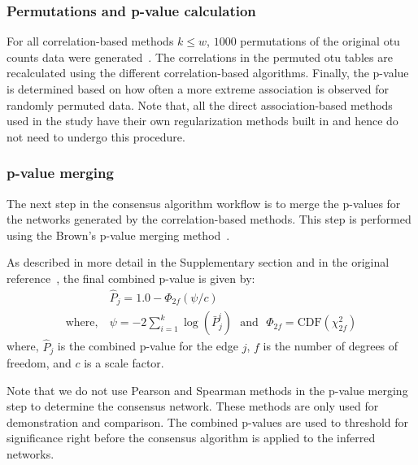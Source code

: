 \documentclass[letterpaper,12pt]{article}
\begin{document}
  \subsubsection*{Permutations and p-value calculation}
  \vspace{-5mm}
  For all correlation-based methods $k \le w$, $1000$ permutations of the original \ac{otu} counts data were generated~\cite{Watts2018}.
  The correlations in the permuted \ac{otu} tables are recalculated using the different correlation-based algorithms.
  Finally, the p-value is determined based on how often a more extreme association is observed for randomly permuted data.
  Note that, all the direct association-based methods used in the study have their own regularization methods built in and hence do not need to undergo this procedure.

  \subsubsection*{p-value merging}
  \vspace{-5mm}
  The next step in the consensus algorithm workflow is to merge the p-values for the networks generated by the correlation-based methods.
  This step is performed using the Brown's p-value merging method~\cite{Poole_Gibbs_Shmulevich_Bernard_Knijnenburg_2016,faustCoNetAppInference2016}.

  As described in more detail in the Supplementary section and in the original reference~\cite{Poole_Gibbs_Shmulevich_Bernard_Knijnenburg_2016}, the final combined p-value is given by:
  \begin{equation}
    \begin{aligned}
        & \hat{P}_j = 1.0 - \Phi_{2f}\left( \psi / c \right) \\
        \text{where},~ &\psi = -2 \sum_{i=1}^k \log(\bar{P}^i_j) ~~~\text{and}~~~ \Phi_{2f} = \mathrm{CDF}\left( \chi^2_{2f} \right)
    \end{aligned}
    \label{eqn:pvalue-combined}
  \end{equation}
  where, $\hat{P}_j$ is the combined p-value for the edge $j$, $f$ is the number of degrees of freedom, and $c$ is a scale factor.

  Note that we do not use Pearson and Spearman methods in the p-value merging step to determine the consensus network.
  These methods are only used for demonstration and comparison.
  The combined p-values are used to threshold for significance right before the consensus algorithm is applied to the inferred networks.
\end{document}
